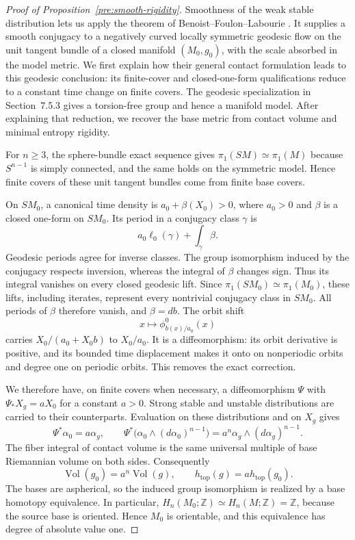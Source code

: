 \documentclass[11pt,a4paper]{article}
\theoremstyle{definition}
\theoremstyle{remark}
\DeclareMathOperator{\Vol}{Vol}
\newcommand{\htop}{h_{\mathrm{top}}}
\numberwithin{equation}{section}
\begin{document}
\begin{proof}[Proof of Proposition~\ref{pre:smooth-rigidity}]
Smoothness of the weak stable distribution lets us apply the theorem
of Benoist--Foulon--Labourie
\citep[Theorem~2]{BenoistFoulonLabourie1992}. It supplies a smooth
conjugacy to a negatively curved locally symmetric geodesic flow on
the unit tangent bundle of a closed manifold $(M_0,g_0)$, with the
scale absorbed in the model metric. We first explain how their general
contact formulation leads to this geodesic conclusion: its finite-cover
and closed-one-form qualifications
\citep[Theorem~1bis and Sections~7.1--7.5]{BenoistFoulonLabourie1992}
reduce to a constant time change on finite covers. The geodesic
specialization in Section~7.5.3 gives a torsion-free group and hence a
manifold model. After explaining that reduction, we recover the base
metric from contact volume and minimal entropy rigidity.

For $n\ge3$, the sphere-bundle exact sequence gives
$\pi_1(SM)\simeq\pi_1(M)$ because $S^{n-1}$ is simply connected,
and the same holds on the symmetric model. Hence finite covers of
these unit tangent bundles come from finite base covers.

On $SM_0$, a canonical time density is
$a_0+\beta(X_0)>0$, where $a_0>0$ and $\beta$ is a closed
one-form on $SM_0$. Its period in a conjugacy class $\gamma$ is
\[
 a_0\ell_0(\gamma)+\int_\gamma\beta.
\]
Geodesic periods agree for inverse classes. The group isomorphism
induced by the conjugacy respects inversion, whereas the integral
of $\beta$ changes sign. Thus its integral vanishes on every
closed geodesic lift. Since $\pi_1(SM_0)\simeq\pi_1(M_0)$,
these lifts, including iterates, represent every nontrivial
conjugacy class in $SM_0$. All periods of $\beta$ therefore vanish,
and $\beta=db$.
The orbit shift
\[
 x\longmapsto\phi^0_{b(x)/a_0}(x)
\]
carries $X_0/(a_0+X_0b)$ to $X_0/a_0$. It is a diffeomorphism:
its orbit derivative is positive, and its bounded time displacement
makes it onto on nonperiodic orbits and degree one on periodic
orbits. This removes the exact correction.

We therefore have, on finite covers when necessary, a diffeomorphism
$\Psi$ with $\Psi_*X_g=aX_0$ for a constant $a>0$. Strong stable
and unstable distributions are carried to their counterparts.
Evaluation on these distributions and on $X_g$ gives
\[
 \Psi^*\alpha_0=a\alpha_g,
 \qquad
 \Psi^*\bigl(\alpha_0\wedge(d\alpha_0)^{n-1}\bigr)
 =a^n\alpha_g\wedge(d\alpha_g)^{n-1}.
\]
The fiber integral of contact volume is the same universal multiple
of base Riemannian volume on both sides. Consequently
\[
 \Vol(g_0)=a^n\Vol(g),
 \qquad \htop(g)=a\htop(g_0).
\]
The bases are aspherical, so the induced group isomorphism is realized
by a base homotopy equivalence. In particular,
$H_n(M_0;\mathbb Z)\simeq H_n(M;\mathbb Z)=\mathbb Z$,
because the source base is oriented. Hence $M_0$ is orientable,
and this equivalence has degree of absolute value one.


\end{proof}
\end{document}
